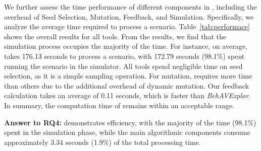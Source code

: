 We further assess the time performance of different components in \tool, including the overhead of Seed Selection, Mutation, Feedback, and Simulation. Specifically, we analyze the average time required to process a scenario. Table~\ref{tab:performace} shows the overall results for all tools. From the results, we find that the simulation process occupies the majority of the time. For instance, on average, \tool takes 176.13 seconds to process a scenario, with 172.79 seconds (98.1\%) spent running the scenario in the simulator. All tools spend negligible time on seed selection, as it is a simple sampling operation. For mutation, \tool requires more time than others due to the additional overhead of dynamic mutation. Our feedback calculation takes an average of 0.11 seconds, which is faster than \textit{BehAVExplor}. In summary, the computation time of \tool remains within an acceptable range.

\begin{ansbox}
\textbf{Answer to RQ4:} \tool demonstrates efficiency, with the majority of the time (98.1\%) spent in the simulation phase, while the main algorithmic components consume approximately 3.34 seconds (1.9\%) of the total processing time.
\end{ansbox}


